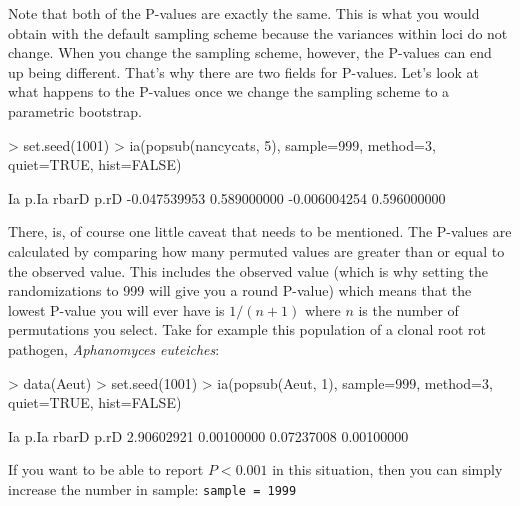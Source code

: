 \documentclass[letterpaper]{article}
\begin{document}
Note that both of the P-values are exactly the same. This is what you would obtain with the default sampling scheme because the variances within loci do not change. When you change the sampling scheme, however, the P-values can end up being different. That's why there are two fields for P-values. Let's look at what happens to the P-values once we change the sampling scheme to a parametric bootstrap.
\begin{Schunk}
\begin{Sinput}
> set.seed(1001)
> ia(popsub(nancycats, 5), sample=999, method=3, quiet=TRUE, hist=FALSE)
\end{Sinput}
\end{Schunk}
\begin{Schunk}
\begin{Soutput}
          Ia         p.Ia        rbarD         p.rD 
-0.047539953  0.589000000 -0.006004254  0.596000000 
\end{Soutput}
\end{Schunk}
There, is, of course one little caveat that needs to be mentioned. The P-values are calculated by comparing how many permuted values are greater than or equal to the observed value. This includes the observed value (which is why setting the randomizations to 999 will give you a round P-value) which means that the lowest P-value you will ever have is $1/(n+1)$ where $n$ is the number of permutations you select. Take for example this population of a clonal root rot pathogen, \textit{Aphanomyces euteiches}:
\begin{Schunk}
\begin{Sinput}
> data(Aeut)
> set.seed(1001)
> ia(popsub(Aeut, 1), sample=999, method=3, quiet=TRUE, hist=FALSE)
\end{Sinput}
\end{Schunk}
\begin{Schunk}
\begin{Soutput}
        Ia       p.Ia      rbarD       p.rD 
2.90602921 0.00100000 0.07237008 0.00100000 
\end{Soutput}
\end{Schunk}
If you want to be able to report $P < 0.001$ in this situation, then you can simply increase the number in sample: \texttt{sample = 1999}
\end{document}
